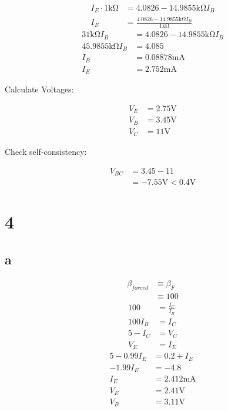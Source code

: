 \documentclass{article}
\begin{document}
\begin{multicols}{2}
    \begin{align*}
        I_E \cdot 1 \si{\kilo\ohm} & = 4.0826 - 14.9855 \si{\kilo\ohm} I_B                           \\
        I_E                        & = \frac{4.0826 - 14.9855 \si{\kilo\ohm} I_B }{1 \si{\kilo\ohm}}
    \end{align*}
    \begin{align*}
        31 \si{\kilo\ohm} I_B      & =  4.0826 - 14.9855 \si{\kilo\ohm} I_B \\
        45.9855 \si{\kilo\ohm} I_B & = 4.085                                \\
        I_B                        & = 0.08878 \si{\milli\ampere}           \\
        I_E                        & = 2.752 \si{\milli\ampere}
    \end{align*}

    Calculate Voltages:

    \begin{align*}
        V_E & = \boxed{2.75 \si{\volt}} \\
        V_B & = \boxed{3.45 \si{\volt}} \\
        V_C & = \boxed{11 \si{\volt}}
    \end{align*}

    Check self-consistency:

    \begin{align*}
        V_{BC} & = 3.45 - 11                                 \\
               & = \boxed{-7.55 \si{\volt} < 0.4 \si{\volt}}
    \end{align*}

    \section*{4}
    \subsection*{a}
    \begin{align*}
        \beta_{forced} & \equiv \beta_F \\
                       & \equiv 100
    \end{align*}
    \begin{align*}
        100     & = \frac{I_C}{I_B} \\
        100 I_B & = I_C             \\
        5-I_C   & = V_C             \\
        V_E     & = I_E
    \end{align*}
    \begin{align*}
        5 - 0.99 I_E & = 0.2 +I_E                 \\
        -1.99 I_E    & = -4.8                     \\
        I_E          & = 2.412 \si{\milli\ampere} \\
        V_E          & = 2.41 \si{\volt}          \\
        V_B          & = \boxed{3.11 \si{\volt}}
    \end{align*}

\end{multicols}
\end{document}
